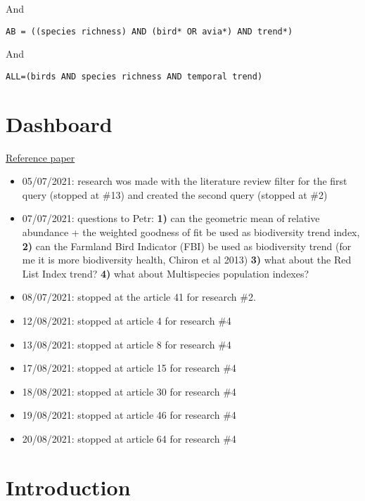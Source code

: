 \documentclass[
  12pt,
  oneside]{report}
\begin{document}
And

\begin{verbatim}
AB = ((species richness) AND (bird* OR avia*) AND trend*) 
\end{verbatim}

And

\begin{verbatim}
ALL=(birds AND species richness AND temporal trend)
\end{verbatim}

\hypertarget{dashboard}{%
\chapter*{Dashboard}\label{dashboard}}

\href{https://www.sciencedirect.com/science/article/pii/S1470160X20306658?via\%3Dihub}{Reference paper}

\begin{itemize}
\item
  05/07/2021: research wos made with the literature review filter for the first query (stopped at \#13) and created the second query (stopped at \#2)
\item
  07/07/2021: questions to Petr: \textbf{1)} can the geometric mean of relative abundance + the weighted goodness of fit be used as biodiversity trend index, \textbf{2)} can the Farmland Bird Indicator (FBI) be used as biodiversity trend (for me it is more biodiversity health, Chiron et al 2013) \textbf{3)} what about the Red List Index trend? \textbf{4)} what about Multispecies population indexes?
\item
  08/07/2021: stopped at the article 41 for research \#2.
\item
  12/08/2021: stopped at article 4 for research \#4
\item
  13/08/2021: stopped at article 8 for research \#4
\item
  17/08/2021: stopped at article 15 for research \#4
\item
  18/08/2021: stopped at article 30 for research \#4
\item
  19/08/2021: stopped at article 46 for research \#4
\item
  20/08/2021: stopped at article 64 for research \#4
\end{itemize}

\hypertarget{introduction}{%
\chapter{Introduction}\label{introduction}}
\end{document}
